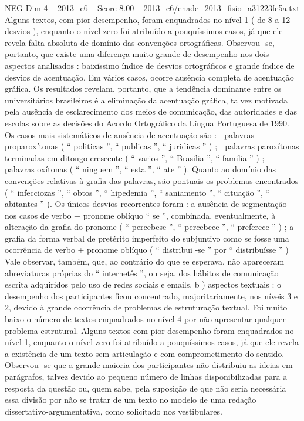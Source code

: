 \begin{textsample}{NEG Dim 4 – 2013\_c6 – Score 8.00 – 2013\_c6/enade\_2013\_fisio\_a31223fe5a.txt}
Alguns textos, com pior desempenho, foram enquadrados no nível 1 ( de 8 a 12 desvios ), enquanto o nível zero foi atribuído a pouquíssimos casos, já que ele revela falta absoluta de domínio das convenções ortográficas.
Observou -se, portanto, que existe uma diferença muito grande de desempenho nos dois aspectos analisados : baixíssimo índice de desvios ortográficos e grande índice de desvios de acentuação.
Em vários casos, ocorre ausência completa de acentuação gráfica.
Os resultados revelam, portanto, que a tendência dominante entre os universitários brasileiros é a eliminação da acentuação gráfica, talvez motivada pela ausência de esclarecimento dos meios de comunicação, das autoridades e das escolas sobre as decisões do Acordo Ortográfico da Língua Portuguesa de 1990.
Os casos mais sistemáticos de ausência de acentuação são :  palavras proparoxítonas ( “ politicas ”, “ publicas ”, “ juridicas ” ) ;  palavras paroxítonas terminadas em ditongo crescente ( “ varios ”, “ Brasilia ”, “ familia ” ) ;  palavras oxítonas ( “ ninguem ”, “ esta ”, “ ate ” ).
Quanto ao domínio das convenções relativas à grafia das palavras, são pontuais os problemas encontrados ( “ infecciozas ”, “ obtos ”, “ hipedemia ”, “ saniamento ”, “ cituação ”, “ abitantes ” ).
Os únicos desvios recorrentes foram : a ausência de segmentação nos casos de verbo + pronome oblíquo “ se ”, combinada, eventualmente, à alteração da grafia do pronome ( “ percebese ”, “ percebece ”, “ preferece ” ) ; a grafia da forma verbal de pretérito imperfeito do subjuntivo como se fosse uma ocorrência de verbo + pronome oblíquo ( “ distribui -se ” por “ distribuísse ” ) Vale observar, também, que, ao contrário do que se esperava, não apareceram abreviaturas próprias do “ internetês ”, ou seja, dos hábitos de comunicação escrita adquiridos pelo uso de redes sociais e emails. b ) aspectos textuais : o desempenho dos participantes ficou concentrado, majoritariamente, nos níveis 3 e 2, devido à grande ocorrência de problemas de estruturação textual.
Foi muito baixo o número de textos enquadrados no nível 4 por não apresentar qualquer problema estrutural.
Alguns textos com pior desempenho foram enquadrados no nível 1, enquanto o nível zero foi atribuído a pouquíssimos casos, já que ele revela a existência de um texto sem articulação e com comprometimento do sentido.
Observou -se que a grande maioria dos participantes não distribuiu as ideias em parágrafos, talvez devido ao pequeno número de linhas disponibilizadas para a resposta da questão ou, quem sabe, pela suposição de que não seria necessária essa divisão por não se tratar de um texto no modelo de uma redação dissertativo-argumentativa, como solicitado nos vestibulares.

\end{textsample}
